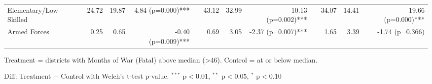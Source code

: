 \begin{table}[htbp]
\begin{tabular}{l rrr c rrr c rrr}
\quad Elementary/Low Skilled & 24.72 & 19.87 & 4.84 (p=0.000)*** &  & 43.12 & 32.99 & 10.13 (p=0.002)*** &  & 34.07 & 14.41 & 19.66 (p=0.000)*** \\
\quad Armed Forces & 0.25 & 0.65 & -0.40 (p=0.009)*** &  & 0.69 & 3.05 & -2.37 (p=0.007)*** &  & 1.65 & 3.39 & -1.74 (p=0.366) \\
\bottomrule
\end{tabular}
\begin{tablenotes}
\small
\item Treatment = districts with Months of War (Fatal) above median (>46). Control = at or below median.
\item Diff: Treatment $-$ Control with Welch's t-test p-value. $^{{***}}$ p$<$0.01, $^{{**}}$ p$<$0.05, $^{{*}}$ p$<$0.10
\end{tablenotes}
\end{table}

\clearpage

